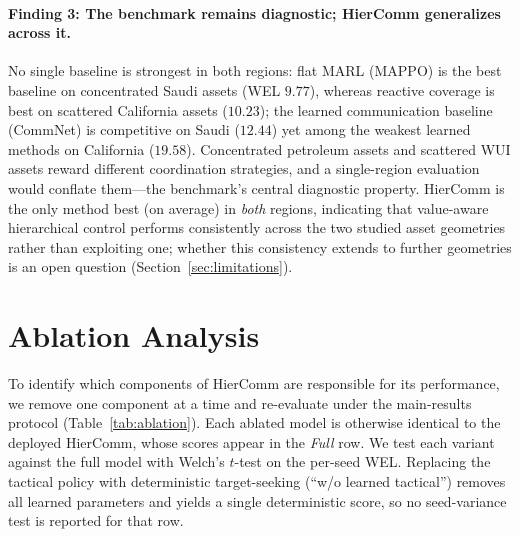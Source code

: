 \documentclass[letterpaper]{article}
\begin{document}
\paragraph{Finding 3: The benchmark remains diagnostic; HierComm generalizes across it.}
No single baseline is strongest in both regions: flat MARL (MAPPO) is the best baseline on concentrated Saudi assets (WEL $9.77$), whereas reactive coverage is best on scattered California assets ($10.23$); the learned communication baseline (CommNet) is competitive on Saudi ($12.44$) yet among the weakest learned methods on California ($19.58$). Concentrated petroleum assets and scattered WUI assets reward different coordination strategies, and a single-region evaluation would conflate them---the benchmark's central diagnostic property. HierComm is the only method best (on average) in \emph{both} regions, indicating that value-aware hierarchical control performs consistently across the two studied asset geometries rather than exploiting one; whether this consistency extends to further geometries is an open question (Section~\ref{sec:limitations}).

\section{Ablation Analysis}
\label{sec:ablation}

To identify which components of HierComm are responsible for its performance, we remove one component at a time and re-evaluate under the main-results protocol (Table~\ref{tab:ablation}). Each ablated model is otherwise identical to the deployed HierComm, whose scores appear in the \emph{Full} row. We test each variant against the full model with Welch's $t$-test on the per-seed WEL. Replacing the tactical policy with deterministic target-seeking (``w/o learned tactical'') removes all learned parameters and yields a single deterministic score, so no seed-variance test is reported for that row.
\end{document}
